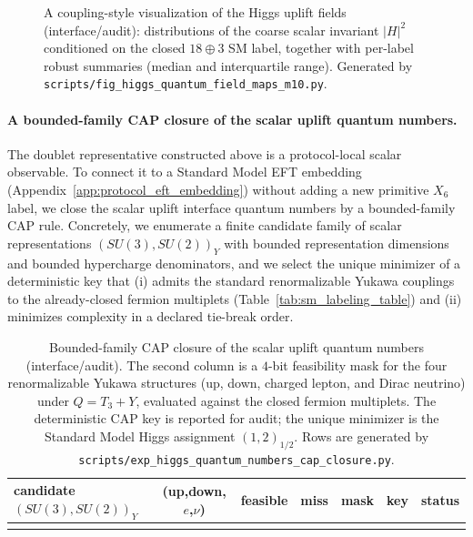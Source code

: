 \begin{figure}[t]
\centering
{}
\caption{A coupling-style visualization of the Higgs uplift fields (interface/audit): distributions of the coarse scalar invariant $|H|^2$ conditioned on the closed $18\oplus 3$ SM label, together with per-label robust summaries (median and interquartile range). Generated by \texttt{scripts/fig\_higgs\_quantum\_field\_maps\_m10.py}.}
\label{fig:higgs_quantum_field_coupling_m10}
\end{figure}

\paragraph{A bounded-family CAP closure of the scalar uplift quantum numbers.}
\AuditTag The doublet representative constructed above is a protocol-local scalar observable.
To connect it to a Standard Model EFT embedding (Appendix~\ref{app:protocol_eft_embedding}) without adding a new primitive $X_6$ label, we close the scalar uplift interface quantum numbers by a bounded-family CAP rule.
Concretely, we enumerate a finite candidate family of scalar representations $(SU(3),SU(2))_Y$ with bounded representation dimensions and bounded hypercharge denominators, and we select the unique minimizer of a deterministic key that (i) admits the standard renormalizable Yukawa couplings to the already-closed fermion multiplets (Table~\ref{tab:sm_labeling_table}) and (ii) minimizes complexity in a declared tie-break order.
%

\begin{table}[t]
\centering
\small
\setlength{\tabcolsep}{7pt}
\renewcommand{\arraystretch}{1.10}
\begin{tabular}{lcccccc}
\toprule
candidate $(SU(3),SU(2))_Y$ & (up,down,$e$,$\nu$) & feasible & miss & mask & key & status \\
\midrule
%
\\
\bottomrule
\end{tabular}
\caption{Bounded-family CAP closure of the scalar uplift quantum numbers (interface/audit). The second column is a $4$-bit feasibility mask for the four renormalizable Yukawa structures (up, down, charged lepton, and Dirac neutrino) under $Q=T_3+Y$, evaluated against the closed fermion multiplets. The deterministic CAP key is reported for audit; the unique minimizer is the Standard Model Higgs assignment $(1,2)_{1/2}$. Rows are generated by \texttt{scripts/exp\_higgs\_quantum\_numbers\_cap\_closure.py}.}
\label{tab:higgs_quantum_numbers_cap_closure}
\end{table}

